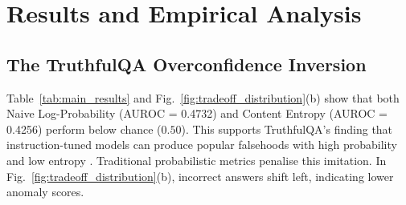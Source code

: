 \documentclass[10pt,twocolumn]{article}
\begin{document}
\section{Results and Empirical Analysis}
\begin{table}[t]
\caption{Performance of different hallucination detection methods on TruthfulQA with Qwen2.5-7B-Instruct. The number in brackets indicates the 95 percent bootstrap confidence interval. Latency represents average real time taken to process each query on the NVIDIA Tesla T4 GPU.}
\label{tab:main_results}
\centering
\small
{}
\end{table}

\subsection{The TruthfulQA Overconfidence Inversion}
Table~\ref{tab:main_results} and Fig.~\ref{fig:tradeoff_distribution}(b) show that both Naive Log-Probability (AUROC = 0.4732) and Content Entropy (AUROC = 0.4256) perform below chance ($0.50$). This supports TruthfulQA's finding that instruction-tuned models can produce popular falsehoods with high probability and low entropy \cite{lin2021truthfulqa}. Traditional probabilistic metrics penalise this imitation. In Fig.~\ref{fig:tradeoff_distribution}(b), incorrect answers shift left, indicating lower anomaly scores.
\end{document}

